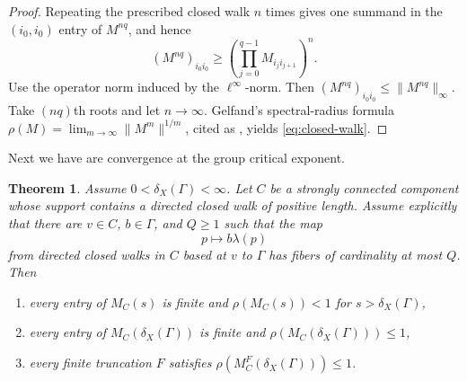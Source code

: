 \documentclass[11pt]{article}
\newtheorem{theorem}{Theorem}[section]
\theoremstyle{definition}
\begin{document}
\begin{proof}
Repeating the prescribed closed walk $n$ times gives one summand in the $(i_0,i_0)$ entry of
$M^{nq}$, and hence
\[
 (M^{nq})_{i_0i_0}
 \ge\left(\prod_{j=0}^{q-1}M_{i_ji_{j+1}}\right)^n.
\]
Use the operator norm induced by the \(\ell^\infty\)-norm. Then $(M^{nq})_{i_0i_0}\le\|M^{nq}\|_\infty$.  Take $(nq)$th roots and let
$n\to\infty$.  Gelfand's spectral-radius formula
$\rho(M)=\lim_{m\to\infty}\|M^m\|^{1/m}$, cited as
\cite[Corollary~5.6.14]{HornJohnson2013}, yields \eqref{eq:closed-walk}.
\end{proof}
Next we have are convergence at the group critical exponent.
\begin{theorem}
\label{thm:critical-exponent-matrix}
Assume $0<\delta_X(\Gamma)<\infty$.  Let $C$ be a strongly connected component whose
support contains a directed closed walk of positive length.  Assume explicitly that there are
$v\in C$, $b\in\Gamma$, and $Q\ge1$ such that the map
\[
 p\longmapsto b\lambda(p)
\]
from directed closed walks in $C$ based at $v$ to $\Gamma$ has fibers of
cardinality at most $Q$.  Then
\begin{enumerate}[label=\textup{(\roman*)}]
\item every entry of $M_C(s)$ is finite and $\rho(M_C(s))<1$ for
$s>\delta_X(\Gamma)$,
\item every entry of $M_C(\delta_X(\Gamma))$ is finite and
$\rho(M_C(\delta_X(\Gamma)))\le1$,
\item every finite truncation $F$ satisfies
$\rho(M_C^F(\delta_X(\Gamma)))\le1$.
\end{enumerate}
\end{theorem}
\end{document}
